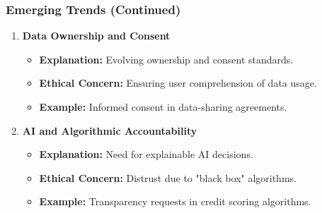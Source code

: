 \documentclass[aspectratio=169]{beamer}
\begin{document}
\begin{frame}[fragile]
  \frametitle{Emerging Trends (Continued)}
  \begin{enumerate}[resume]
    \item \textbf{Data Ownership and Consent}
      \begin{itemize}
        \item \textbf{Explanation:} Evolving ownership and consent standards.
        \item \textbf{Ethical Concern:} Ensuring user comprehension of data usage.
        \item \textbf{Example:} Informed consent in data-sharing agreements.
      \end{itemize}

    \item \textbf{AI and Algorithmic Accountability}
      \begin{itemize}
        \item \textbf{Explanation:} Need for explainable AI decisions.
        \item \textbf{Ethical Concern:} Distrust due to "black box" algorithms.
        \item \textbf{Example:} Transparency requests in credit scoring algorithms.
      \end{itemize}
  \end{enumerate}
\end{frame}
\end{document}

